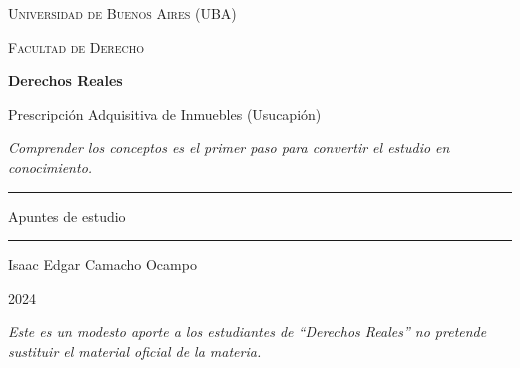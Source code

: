 \documentclass[12pt,oneside]{book}
\newcommand{\universidad}{Universidad de Buenos Aires (UBA)}
\newcommand{\facultad}{Facultad de Derecho}
\newcommand{\materia}{Derechos Reales}
\newcommand{\titulo}{Prescripción Adquisitiva de Inmuebles (Usucapión)}
\newcommand{\autor}{Isaac Edgar Camacho Ocampo}
\newcommand{\anio}{2024}
\begin{document}
\begin{titlepage}

\thispagestyle{empty}

\begin{center}

\vspace*{1cm}

{\large \textsc{\universidad}}

\vspace{0.2cm}

{\large \textsc{\facultad}}

\vspace{3cm}

{\Huge \textbf{\materia}}

\vspace{1cm}

{\LARGE \titulo}

\vspace{0.8cm}

\textit{Comprender los conceptos es el primer paso para convertir el estudio en conocimiento.}

\vspace{1.2cm}

\rule{0.70\textwidth}{0.5pt}

\vspace{0.5cm}

{\large Apuntes de estudio}

\vspace{0.5cm}

\rule{0.70\textwidth}{0.5pt}

\vfill

{\large \autor}

\vspace{0.3cm}

{\large \anio}

\end{center}

\vfill

\begin{flushleft}
\textit{Este es un modesto aporte a los estudiantes de ``\materia'' no pretende sustituir el material oficial de la materia.}
\end{flushleft}

\end{titlepage}

\tableofcontents
\end{document}
